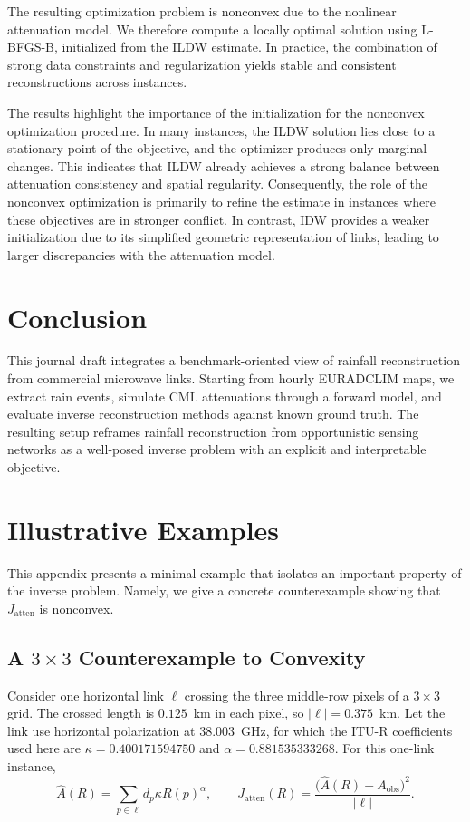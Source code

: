 \documentclass[a4paper,fleqn]{cas-sc}
\begin{document}
The resulting optimization problem is nonconvex due to the nonlinear attenuation model. We therefore compute a locally optimal solution using L-BFGS-B, initialized from the ILDW estimate. In practice, the combination of strong data constraints and regularization yields stable and consistent reconstructions across instances.

The results highlight the importance of the initialization for the nonconvex optimization procedure. In many instances, the ILDW solution lies close to a stationary point of the objective, and the optimizer produces only marginal changes. This indicates that ILDW already achieves a strong balance between attenuation consistency and spatial regularity. Consequently, the role of the nonconvex optimization is primarily to refine the estimate in instances where these objectives are in stronger conflict. In contrast, IDW provides a weaker initialization due to its simplified geometric representation of links, leading to larger discrepancies with the attenuation model.
\section{Conclusion}
This journal draft integrates a benchmark-oriented view of rainfall reconstruction from commercial microwave links. Starting from hourly EURADCLIM maps, we extract rain events, simulate CML attenuations through a forward model, and evaluate inverse reconstruction methods against known ground truth. The resulting setup reframes rainfall reconstruction from opportunistic sensing networks as a well-posed inverse problem with an explicit and interpretable objective.



\appendix
{}

\section{Illustrative Examples}

This appendix presents a minimal example that isolates an important property of the inverse problem. Namely, we give a concrete counterexample showing that $J_{\text{atten}}$ is nonconvex.

\subsection{A $3\times3$ Counterexample to Convexity}
\label{appendix:nonconvexity-example}
Consider one horizontal link $\ell$ crossing the three middle-row pixels of a
$3\times3$ grid.  The crossed length is $0.125$~km in each pixel, so
$|\ell|=0.375$~km.  Let the link use horizontal polarization at
$38.003$~GHz, for which the ITU-R coefficients used here are
$\kappa=0.400171594750$ and $\alpha=0.881535333268$.  For this one-link
instance,
\[
\widehat A(R)=\sum_{p\in\ell}d_p\kappa R(p)^\alpha,
\qquad
J_{\mathrm{atten}}(R)=
\frac{\bigl(\widehat A(R)-A_{\mathrm{obs}}\bigr)^2}{|\ell|}.
\]
\end{document}
